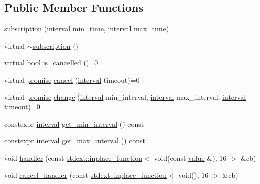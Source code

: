 \subsection*{Public Member Functions}
\begin{DoxyCompactItemize}
\item 
\hyperlink{classtelegen_1_1subscription_a506c90eb0e3ba380473a742011ef3f3b}{subscription} (\hyperlink{namespacetelegen_ad925de2d0a99bc43918533abf0457344}{interval} min\+\_\+time, \hyperlink{namespacetelegen_ad925de2d0a99bc43918533abf0457344}{interval} max\+\_\+time)
\item 
virtual \hyperlink{classtelegen_1_1subscription_a2dcbdaadf0071d4f4485f018bceb7eb6}{$\sim$subscription} ()
\item 
virtual bool \hyperlink{classtelegen_1_1subscription_a4bbe4edbb2ecba3ccff4d6de562e2e7d}{is\+\_\+cancelled} ()=0
\item 
virtual \hyperlink{namespacetelegen_a9dd802bb5d30cf96b0c616750d43ae86}{promise} \hyperlink{classtelegen_1_1subscription_a7d645e1bf76477316d9f868a69467e42}{cancel} (\hyperlink{namespacetelegen_ad925de2d0a99bc43918533abf0457344}{interval} timeout)=0
\item 
virtual \hyperlink{namespacetelegen_a9dd802bb5d30cf96b0c616750d43ae86}{promise} \hyperlink{classtelegen_1_1subscription_aca992d1891107380ec81a517ea0bde58}{change} (\hyperlink{namespacetelegen_ad925de2d0a99bc43918533abf0457344}{interval} min\+\_\+interval, \hyperlink{namespacetelegen_ad925de2d0a99bc43918533abf0457344}{interval} max\+\_\+interval, \hyperlink{namespacetelegen_ad925de2d0a99bc43918533abf0457344}{interval} timeout)=0
\item 
constexpr \hyperlink{namespacetelegen_ad925de2d0a99bc43918533abf0457344}{interval} \hyperlink{classtelegen_1_1subscription_a81200099d915e3e69c0c1dbd940dfc40}{get\+\_\+min\+\_\+interval} () const
\item 
constexpr \hyperlink{namespacetelegen_ad925de2d0a99bc43918533abf0457344}{interval} \hyperlink{classtelegen_1_1subscription_a7901d4f487f0a8348a0593cd0787f7f9}{get\+\_\+max\+\_\+interval} () const
\item 
void \hyperlink{classtelegen_1_1subscription_acde1f5ed4c26f44c2b9f1929cf1af725}{handler} (const \hyperlink{classstdext_1_1inplace__function}{stdext\+::inplace\+\_\+function}$<$ void(const \hyperlink{classtelegen_1_1value}{value} \&), 16 $>$ \&cb)
\item 
void \hyperlink{classtelegen_1_1subscription_a84147a4afc90285df4c12d9243ffdece}{cancel\+\_\+handler} (const \hyperlink{classstdext_1_1inplace__function}{stdext\+::inplace\+\_\+function}$<$ void(), 16 $>$ \&cb)
\end{DoxyCompactItemize}
